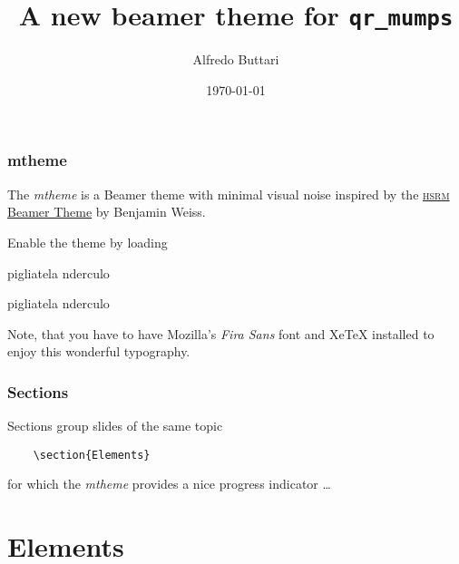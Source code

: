 \documentclass[10pt, compress]{beamer}
\title{A new beamer theme for \texttt{qr\_mumps}}
\subtitle{}
\date{\today}
\author{Alfredo Buttari}
\institute{Institute or miscellaneous information}
\begin{document}
\maketitle

\begin{frame}[fragile]
  \frametitle{mtheme}

  The \emph{mtheme} is a Beamer theme with minimal visual noise inspired by the
  \href{https://github.com/hsrmbeamertheme/hsrmbeamertheme}{\textsc{hsrm} Beamer
  Theme} by Benjamin Weiss.

  Enable the theme by loading


  \begin{block}{pigliatela}
    nderculo
  \end{block}

  \begin{exampleblock}{pigliatela}
    nderculo
  \end{exampleblock}

  Note, that you have to have Mozilla's \emph{Fira Sans} font and XeTeX
  installed to enjoy this wonderful typography.
\end{frame}

\begin{frame}[fragile]
  \frametitle{Sections}
  Sections group slides of the same topic

\begin{verbatim}
    \section{Elements}
\end{verbatim}

  for which the \emph{mtheme} provides a nice progress indicator \ldots
\end{frame}

\section{Elements}
\end{document}
